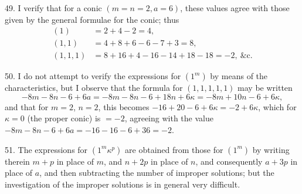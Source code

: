 \documentclass[12pt,a4paper]{article}
\begin{document}
49. I verify that for a conic $(m = n = 2, a = 6)$, these values agree with those given by the general formulae for the conic; thus
\begin{align*}
(1) &= 2 + 4 - 2 = 4,\\
(1, 1) &= 4 + 8 + 6 - 6 - 7 + 3 = 8,\\
(1, 1, 1) &= 8 + 16 + 4 - 16 - 14 + 18 - 18 = -2,\ \&\text{c.}
\end{align*}

50. I do not attempt to verify the expressions for $(1^m)$ by means of the characteristics, but I observe that the formula for $(1, 1, 1, 1, 1)$ may be written
\[
-8m - 8n - 6 + 6a = -8m - 8n - 6 + 18n + 6\kappa = -8m + 10n - 6 + 6\kappa,
\]
and that for $m = 2$, $n = 2$, this becomes $-16 + 20 - 6 + 6\kappa = -2 + 6\kappa$, which for $\kappa = 0$ (the proper conic) is $= -2$, agreeing with the value $-8m - 8n - 6 + 6a = -16 - 16 - 6 + 36 = -2$.

51. The expressions for $(1^m \kappa^p)$ are obtained from those for $(1^m)$ by writing therein $m + p$ in place of $m$, and $n + 2p$ in place of $n$, and consequently $a + 3p$ in place of $a$, and then subtracting the number of improper solutions; but the investigation of the improper solutions is in general very difficult.
\end{document}
